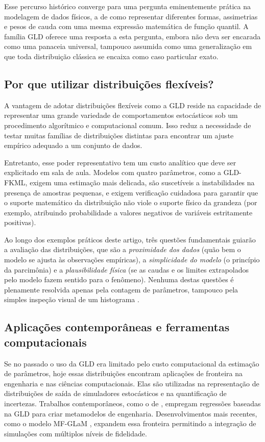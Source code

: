 Esse percurso histórico converge para uma pergunta eminentemente prática na modelagem de dados físicos, a de como representar diferentes formas, assimetrias e pesos de cauda com uma mesma expressão matemática de função quantil. A família GLD oferece uma resposta a esta pergunta, embora não deva ser encarada como uma panaceia universal, tampouco assumida como uma generalização em que toda distribuição clássica se encaixa como caso particular exato.

\subsection{Por que utilizar distribuições flexíveis?}

A vantagem de adotar distribuições flexíveis como a GLD reside na capacidade de representar uma grande variedade de comportamentos estocásticos sob um procedimento algorítmico e computacional comum. Isso reduz a necessidade de testar muitas famílias de distribuições distintas para encontrar um ajuste empírico adequado a um conjunto de dados.

Entretanto, esse poder representativo tem um custo analítico que deve ser explicitado em sala de aula. Modelos com quatro parâmetros, como a GLD-FKML, exigem uma estimação mais delicada, são suscetíveis a instabilidades na presença de amostras pequenas, e exigem verificação cuidadosa para garantir que o suporte matemático da distribuição não viole o suporte físico da grandeza (por exemplo, atribuindo probabilidade a valores negativos de variáveis estritamente positivas).

Ao longo dos exemplos práticos deste artigo, três questões fundamentais guiarão a avaliação das distribuições, que são a \textit{proximidade dos dados} (quão bem o modelo se ajusta às observações empíricas), a \textit{simplicidade do modelo} (o princípio da parcimônia) e a \textit{plausibilidade física} (se as caudas e os limites extrapolados pelo modelo fazem sentido para o fenômeno). Nenhuma destas questões é plenamente resolvida apenas pela contagem de parâmetros, tampouco pela simples inspeção visual de um histograma \parencite{nist2012}.

\subsection{Aplicações contemporâneas e ferramentas computacionais}

Se no passado o uso da GLD era limitado pelo custo computacional da estimação de parâmetros, hoje essas distribuições encontram aplicações de fronteira na engenharia e nas ciências computacionais. Elas são utilizadas na representação de distribuições de saída de simuladores estocásticos e na quantificação de incertezas. Trabalhos contemporâneos, como o de \textcite{zhu2021}, empregam regressões baseadas na GLD para criar metamodelos de engenharia. Desenvolvimentos mais recentes, como o modelo MF-GLaM \parencite{giannoukou2025mfgllam}, expandem essa fronteira permitindo a integração de simulações com múltiplos níveis de fidelidade.


